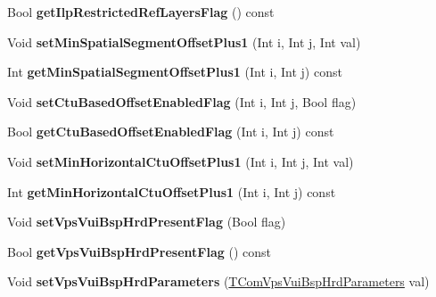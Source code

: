 \begin{DoxyCompactItemize}
\mbox{\label{class_t_com_v_p_s_v_u_i_a09940f8250b1e64af1f845800dbe1fd5}} 
Bool {\bfseries get\+Ilp\+Restricted\+Ref\+Layers\+Flag} () const
\item 
\mbox{\label{class_t_com_v_p_s_v_u_i_a58e8d3866c8960a270a41383c7fd5fda}} 
Void {\bfseries set\+Min\+Spatial\+Segment\+Offset\+Plus1} (Int i, Int j, Int val)
\item 
\mbox{\label{class_t_com_v_p_s_v_u_i_a339d98130f830b4c6a67ecf1703fc6e7}} 
Int {\bfseries get\+Min\+Spatial\+Segment\+Offset\+Plus1} (Int i, Int j) const
\item 
\mbox{\label{class_t_com_v_p_s_v_u_i_af5678c49f2f423c8bbfcf8b6b39e8974}} 
Void {\bfseries set\+Ctu\+Based\+Offset\+Enabled\+Flag} (Int i, Int j, Bool flag)
\item 
\mbox{\label{class_t_com_v_p_s_v_u_i_a8d789b1b95d67e16efd30e753514f2fa}} 
Bool {\bfseries get\+Ctu\+Based\+Offset\+Enabled\+Flag} (Int i, Int j) const
\item 
\mbox{\label{class_t_com_v_p_s_v_u_i_af2fde510a2eaee4c5bef57ed3e4ce01c}} 
Void {\bfseries set\+Min\+Horizontal\+Ctu\+Offset\+Plus1} (Int i, Int j, Int val)
\item 
\mbox{\label{class_t_com_v_p_s_v_u_i_a6f22946a4a0884debbf411d44ea9d593}} 
Int {\bfseries get\+Min\+Horizontal\+Ctu\+Offset\+Plus1} (Int i, Int j) const
\item 
\mbox{\label{class_t_com_v_p_s_v_u_i_a7dee8643b58ab2426ef70c09697a5795}} 
Void {\bfseries set\+Vps\+Vui\+Bsp\+Hrd\+Present\+Flag} (Bool flag)
\item 
\mbox{\label{class_t_com_v_p_s_v_u_i_a03282d7a376c1869dc65447a0aa3efc0}} 
Bool {\bfseries get\+Vps\+Vui\+Bsp\+Hrd\+Present\+Flag} () const
\item 
\mbox{\label{class_t_com_v_p_s_v_u_i_a035598ca1024905d8863723e113e70b8}} 
Void {\bfseries set\+Vps\+Vui\+Bsp\+Hrd\+Parameters} (\hyperlink{class_t_com_vps_vui_bsp_hrd_parameters}{T\+Com\+Vps\+Vui\+Bsp\+Hrd\+Parameters} val)

\end{DoxyCompactItemize}
